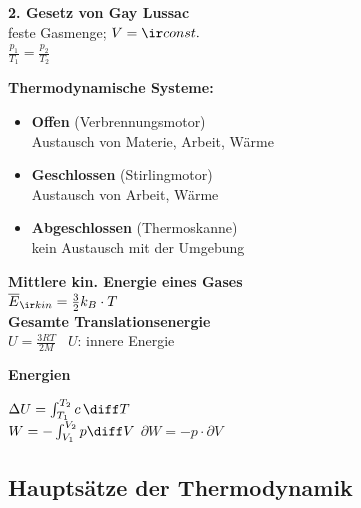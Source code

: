 \documentclass[german]{latex4ei/latex4ei_sheet}
\begin{document}
\textbf{2. Gesetz von Gay Lussac} \\
feste Gasmenge; $V=\ir const.$\\
$\frac{p_1}{T_1}=\frac{p_2}{T_2}$ \\
\begin{sectionbox}
\textbf{Thermodynamische Systeme:}
\begin{itemize}
	\item \textbf{Offen} (Verbrennungsmotor) \\
		Austausch von Materie, Arbeit, Wärme
	\item \textbf{Geschlossen} (Stirlingmotor) \\
		Austausch von Arbeit, Wärme
	\item \textbf{Abgeschlossen} (Thermoskanne) \\
		kein Austausch mit der Umgebung
		
\end{itemize}
\end{sectionbox}
\textbf{Mittlere kin. Energie eines Gases} \\
$\overline{E}_{\ir kin}=\frac{3}{2}k_B \cdot T$ \\

\textbf{Gesamte Translationsenergie} \\
$U=\frac{3RT}{2M}$ \, $U$: innere Energie

\textbf{Energien}
\begin{sectionbox}
$\Delta U = \int_{T_1}^{T_2} c \, \diff T$\\
$W=-\int_{V_1}^{V_2} p \diff V$ \qquad $\partial W= -p \cdot \partial V$
\end{sectionbox}

\subsection{Hauptsätze der Thermodynamik}
\end{document}

